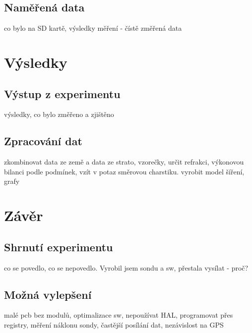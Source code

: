 \documentclass[twoside]{ctuthesis}
\theoremstyle{plain}
\theoremstyle{definition}
\theoremstyle{note}
\begin{document}
	\section{Naměřená data}
	co bylo na SD kartě, výsledky měření - čístě změřená data



\chapter{Výsledky}
	\section{Výstup z experimentu}
	výsledky, co bylo změřeno a zjištěno

	\section{Zpracování dat}
	zkombinovat data ze země a data ze strato, vzorečky, určit refrakci, výkonovou bilanci podle podmínek, vzít v potaz směrovou charstiku. vyrobit model šíření, grafy

	
	
















	


\chapter{Závěr}
	\section{Shrnutí experimentu}
	co se povedlo, co se nepovedlo. Vyrobil jsem sondu a sw, přestala vysílat - proč? 

	\section{Možná vylepšení}
	malé pcb bez modulů, optimalizace sw, nepoužívat HAL, programovat přes registry, měření náklonu sondy, častější posílání dat, nezávislost na GPS

	
















	


\appendix

\printindex

\appendix




\end{document}
